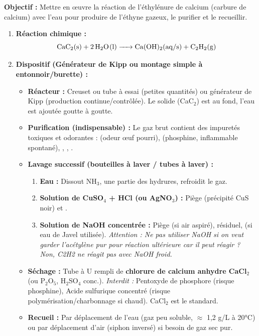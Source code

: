 \documentclass[11pt]{article}
\begin{document}
\begin{methode}
\textbf{Objectif :} Mettre en œuvre la réaction de l'éthylénure de calcium (carbure de calcium) avec l'eau pour produire de l'éthyne gazeux, le purifier et le recueillir.

\begin{enumerate}
    \item \textbf{Réaction chimique :} 
    \[ \ce{CaC2(s) + 2 H2O(l) -> Ca(OH)2(aq/s) + C2H2(g)} \]
    \item \textbf{Dispositif (Générateur de Kipp ou montage simple à entonnoir/burette) :}
        \begin{itemize}
            \item \textbf{Réacteur :} Creuset ou tube à essai (petites quantités) ou générateur de Kipp (production continue/contrôlée). Le solide (CaC$_2$) est au fond, l'eau est ajoutée goutte à goutte.
            \item \textbf{Purification (indispensable) :} Le gaz brut contient des impuretés toxiques et odorantes :  (odeur œuf pourri),  (phosphine, inflammable spontané), , , .
            \item \textbf{Lavage successif (bouteilles à laver / tubes à laver) :}
                \begin{enumerate}
                    \item \textbf{Eau :} Dissout NH$_3$, une partie des hydrures, refroidit le gaz.
                    \item \textbf{Solution de CuSO$_4$ + HCl (ou AgNO$_3$) :} Piège  (précipité CuS noir) et .
                    \item \textbf{Solution de NaOH concentrée :} Piège  (si air aspiré),  résiduel,  (si eau de Javel utilisée). \textit{Attention : Ne pas utiliser NaOH si on veut garder l'acétylène pur pour réaction ultérieure car il peut réagir ? Non, C2H2 ne réagit pas avec NaOH froid.}
                \end{enumerate}
            \item \textbf{Séchage :} Tube à U rempli de \textbf{chlorure de calcium anhydre CaCl$_2$} (ou P$_2$O$_5$, H$_2$SO$_4$ conc.). \textit{Interdit :} Pentoxyde de phosphore (risque phosphine), Acide sulfurique concentré (risque polymérisation/charbonnage si chaud). CaCl$_2$ est le standard.
            \item \textbf{Recueil :} Par déplacement de l'eau (gaz peu soluble, $\approx$ 1,2 g/L à 20°C) ou par déplacement d'air (siphon inversé) si besoin de gaz sec pur.

\end{itemize}
\end{enumerate}
\end{methode}
\end{document}
